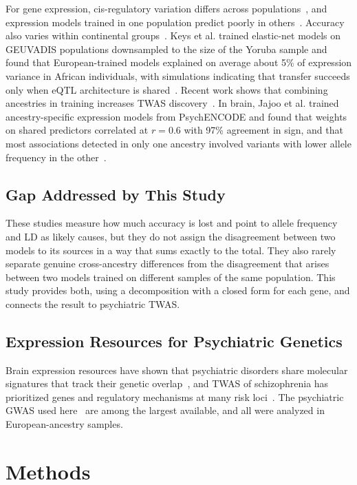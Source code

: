 \documentclass[conference]{IEEEtran}
\begin{document}
For gene expression, cis-regulatory variation differs across populations~\cite{stranger2012}, and expression models trained in one population predict poorly in others~\cite{mogil2018}. Accuracy also varies within continental groups~\cite{mikhaylova2019}. Keys et al. trained elastic-net models on GEUVADIS populations downsampled to the size of the Yoruba sample and found that European-trained models explained on average about 5\% of expression variance in African individuals, with simulations indicating that transfer succeeds only when eQTL architecture is shared~\cite{keys2020}. Recent work shows that combining ancestries in training increases TWAS discovery~\cite{bledsoe2026}. In brain, Jajoo et al. trained ancestry-specific expression models from PsychENCODE and found that weights on shared predictors correlated at $r = 0.6$ with 97\% agreement in sign, and that most associations detected in only one ancestry involved variants with lower allele frequency in the other~\cite{jajoo2025}.

\subsection{Gap Addressed by This Study}
These studies measure how much accuracy is lost and point to allele frequency and LD as likely causes, but they do not assign the disagreement between two models to its sources in a way that sums exactly to the total. They also rarely separate genuine cross-ancestry differences from the disagreement that arises between two models trained on different samples of the same population. This study provides both, using a decomposition with a closed form for each gene, and connects the result to psychiatric TWAS.

\subsection{Expression Resources for Psychiatric Genetics}
Brain expression resources have shown that psychiatric disorders share molecular signatures that track their genetic overlap~\cite{gandal2018,wang2018}, and TWAS of schizophrenia has prioritized genes and regulatory mechanisms at many risk loci~\cite{gusev2018}. The psychiatric GWAS used here~\cite{grove2019,trubetskoy2022,mullins2021,adams2025,nievergelt2024} are among the largest available, and all were analyzed in European-ancestry samples.

\section{Methods}
\end{document}
